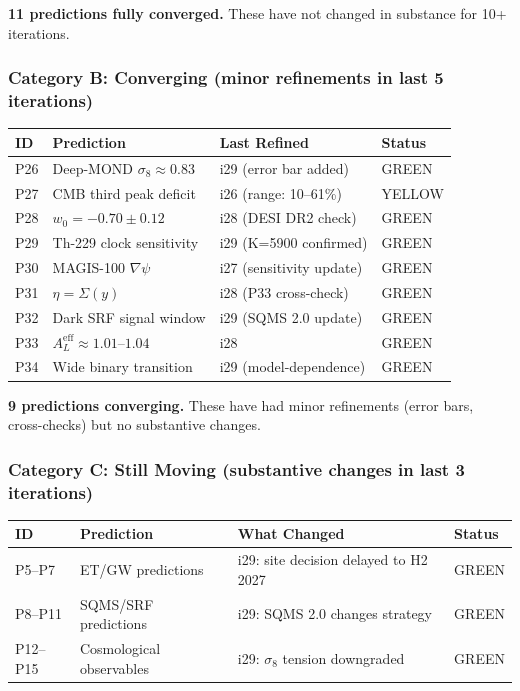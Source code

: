 \documentclass[11pt,a4paper]{article}
\begin{document}
\textbf{11 predictions fully converged.} These have not changed in substance for 10+ iterations.

\subsubsection{Category B: Converging (minor refinements in last 5 iterations)}
\begin{center}
\begin{longtable}{p{1.5cm}p{6cm}p{3cm}p{2.5cm}}
\toprule
\textbf{ID} & \textbf{Prediction} & \textbf{Last Refined} & \textbf{Status} \\
\midrule
\endfirsthead
P26 & Deep-MOND $\sigma_8 \approx 0.83$ & i29 (error bar added) & GREEN \\
P27 & CMB third peak deficit & i26 (range: 10--61\%) & YELLOW \\
P28 & $w_0 = -0.70 \pm 0.12$ & i28 (DESI DR2 check) & GREEN \\
P29 & Th-229 clock sensitivity & i29 (K=5900 confirmed) & GREEN \\
P30 & MAGIS-100 $\nabla\psi$ & i27 (sensitivity update) & GREEN \\
P31 & $\eta = \Sigma(y)$ & i28 (P33 cross-check) & GREEN \\
P32 & Dark SRF signal window & i29 (SQMS 2.0 update) & GREEN \\
P33 & $A_L^\mathrm{eff} \approx 1.01$--$1.04$ & i28 & GREEN \\
P34 & Wide binary transition & i29 (model-dependence) & GREEN \\
\bottomrule
\end{longtable}
\end{center}

\textbf{9 predictions converging.} These have had minor refinements (error bars, cross-checks) but no substantive changes.

\subsubsection{Category C: Still Moving (substantive changes in last 3 iterations)}
\begin{center}
\begin{longtable}{p{1.5cm}p{6cm}p{3cm}p{2.5cm}}
\toprule
\textbf{ID} & \textbf{Prediction} & \textbf{What Changed} & \textbf{Status} \\
\midrule
\endfirsthead
P5--P7 & ET/GW predictions & i29: site decision delayed to H2 2027 & GREEN \\
P8--P11 & SQMS/SRF predictions & i29: SQMS 2.0 changes strategy & GREEN \\
P12--P15 & Cosmological observables & i29: $\sigma_8$ tension downgraded & GREEN \\
\bottomrule
\end{longtable}
\end{center}
\end{document}
